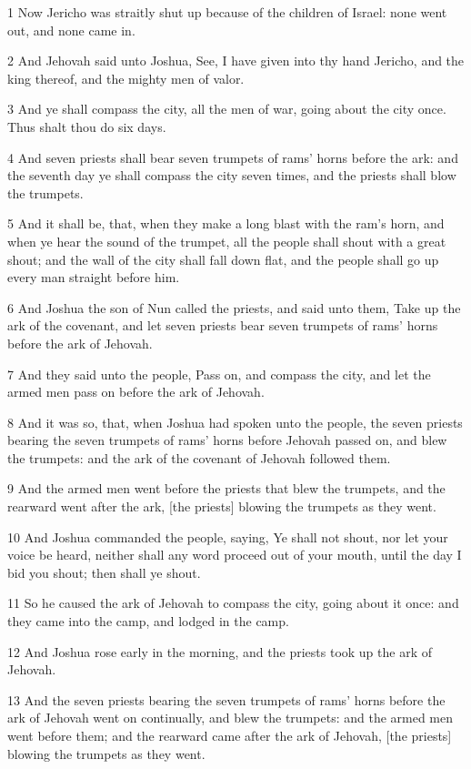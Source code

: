 \par 1 Now Jericho was straitly shut up because of the children of Israel: none went out, and none came in.
\par 2 And Jehovah said unto Joshua, See, I have given into thy hand Jericho, and the king thereof, and the mighty men of valor.
\par 3 And ye shall compass the city, all the men of war, going about the city once. Thus shalt thou do six days.
\par 4 And seven priests shall bear seven trumpets of rams' horns before the ark: and the seventh day ye shall compass the city seven times, and the priests shall blow the trumpets.
\par 5 And it shall be, that, when they make a long blast with the ram's horn, and when ye hear the sound of the trumpet, all the people shall shout with a great shout; and the wall of the city shall fall down flat, and the people shall go up every man straight before him.
\par 6 And Joshua the son of Nun called the priests, and said unto them, Take up the ark of the covenant, and let seven priests bear seven trumpets of rams' horns before the ark of Jehovah.
\par 7 And they said unto the people, Pass on, and compass the city, and let the armed men pass on before the ark of Jehovah.
\par 8 And it was so, that, when Joshua had spoken unto the people, the seven priests bearing the seven trumpets of rams' horns before Jehovah passed on, and blew the trumpets: and the ark of the covenant of Jehovah followed them.
\par 9 And the armed men went before the priests that blew the trumpets, and the rearward went after the ark, [the priests] blowing the trumpets as they went.
\par 10 And Joshua commanded the people, saying, Ye shall not shout, nor let your voice be heard, neither shall any word proceed out of your mouth, until the day I bid you shout; then shall ye shout.
\par 11 So he caused the ark of Jehovah to compass the city, going about it once: and they came into the camp, and lodged in the camp.
\par 12 And Joshua rose early in the morning, and the priests took up the ark of Jehovah.
\par 13 And the seven priests bearing the seven trumpets of rams' horns before the ark of Jehovah went on continually, and blew the trumpets: and the armed men went before them; and the rearward came after the ark of Jehovah, [the priests] blowing the trumpets as they went.
